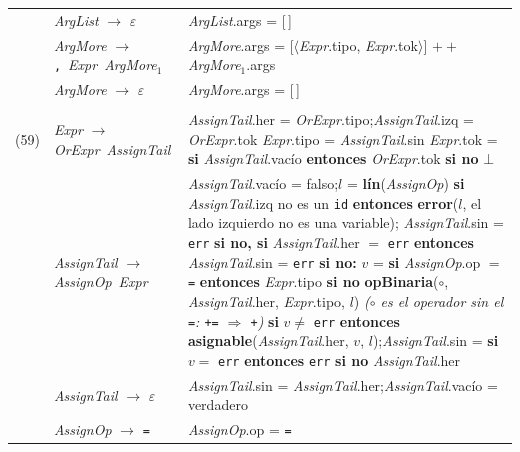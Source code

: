 \documentclass[11pt]{article}
\newcommand{\NT}[1]{\textcolor{ntcolor}{\textit{#1}}}            %
\newcommand{\T}[1]{\textcolor{tcolor}{\texttt{#1}}}              %
\newcommand{\A}[2]{\NT{#1}.\textsf{#2}}                          %
\newcommand{\Ax}[3]{\NT{#1}$_{#2}$.\textsf{#3}}                  %
\newcommand{\fn}[1]{\textsf{\textbf{#1}}}                        %
\newcommand{\ty}[1]{\texttt{#1}}                                 %
\newcommand{\kw}[1]{\textbf{#1}}                                 %
\begin{document}
{\begin{longtable}{@{}r@{\hspace{6pt}}>{\raggedright\arraybackslash}p{5.6cm}@{\hspace{8pt}}>{\raggedright\arraybackslash}p{9.9cm}@{}}
\addlinespace[2pt]
{(56)} & \NT{ArgList} $\rightarrow$ $\varepsilon$ & \A{ArgList}{args} = [\,] \\
\addlinespace[2pt]
{(57)} & \NT{ArgMore} $\rightarrow$ \T{,}\ \NT{Expr}\ \NT{ArgMore}$_{1}$ & \A{ArgMore}{args} = [$\langle$\A{Expr}{tipo}, \A{Expr}{tok}$\rangle$] $\mathbin{+\!\!+}$ \Ax{ArgMore}{1}{args} \\
\addlinespace[2pt]
{(58)} & \NT{ArgMore} $\rightarrow$ $\varepsilon$ & \A{ArgMore}{args} = [\,] \\
\addlinespace[2pt]
\midrule
\multicolumn{3}{l}{\textbf{Asignación}} \\ \midrule
{(59)} & \NT{Expr} $\rightarrow$ \NT{OrExpr}\ \NT{AssignTail} & \A{AssignTail}{her} = \A{OrExpr}{tipo};\quad \A{AssignTail}{izq} = \A{OrExpr}{tok} \newline \A{Expr}{tipo} = \A{AssignTail}{sin} \newline \A{Expr}{tok} = \kw{si} \A{AssignTail}{vacío} \kw{entonces} \A{OrExpr}{tok} \kw{si no} $\bot$ \\
\addlinespace[2pt]
{(60)} & \NT{AssignTail} $\rightarrow$ \NT{AssignOp}\ \NT{Expr} & \A{AssignTail}{vacío} = \textsf{falso};\quad $l$ = \fn{lín}(\NT{AssignOp}) \newline \kw{si} \A{AssignTail}{izq} no es un \T{id} \kw{entonces} \fn{error}($l$, el lado izquierdo no es una variable); \A{AssignTail}{sin} = \ty{err} \newline \kw{si no, si} \A{AssignTail}{her} $=$ \ty{err} \kw{entonces} \A{AssignTail}{sin} = \ty{err} \newline \kw{si no:} $v$ = \kw{si} \A{AssignOp}{op} $=$ \T{=} \kw{entonces} \A{Expr}{tipo} \kw{si no} \fn{opBinaria}($\circ$, \A{AssignTail}{her}, \A{Expr}{tipo}, $l$) \newline \hspace*{1.5em}\textit{($\circ$ es el operador sin el \T{=}: \T{+=} $\Rightarrow$ \T{+})} \newline \hspace*{1.5em}\kw{si} $v \neq$ \ty{err} \kw{entonces} \fn{asignable}(\A{AssignTail}{her}, $v$, $l$);\quad \A{AssignTail}{sin} = \kw{si} $v =$ \ty{err} \kw{entonces} \ty{err} \kw{si no} \A{AssignTail}{her} \\
\addlinespace[2pt]
{(61)} & \NT{AssignTail} $\rightarrow$ $\varepsilon$ & \A{AssignTail}{sin} = \A{AssignTail}{her};\quad \A{AssignTail}{vacío} = \textsf{verdadero} \\
\addlinespace[2pt]
{(62)} & \NT{AssignOp} $\rightarrow$ \T{=} & \A{AssignOp}{op} = \T{=} \\

\end{longtable}}
\end{document}

